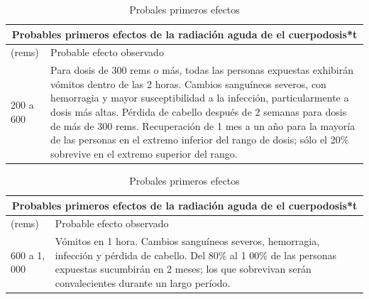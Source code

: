 \documentclass{beamer}
\begin{document}
\begin{frame}
	
	\begin{table}[h!]
		\centering
		\begin{tabular}{||m{1cm}|m{20em}||}
			\hline
			\multicolumn{2}{|c|}{Probables primeros efectos de la radiación aguda de el cuerpodosis*t} \\
			\hline	\hline
			(rems)                                                            & Probable efecto observado                                                                                                                                                          			\\ \hline
			200 a 600                                                                    & Para dosis de 300 rems o más, todas las personas expuestas exhibirán vómitos dentro de las 2 horas. Cambios sanguíneos severos, con hemorragia y mayor susceptibilidad a la infección, particularmente a dosis más altas. Pérdida de cabello después de 2 semanas para dosis de más de 300 rems. Recuperación de 1 mes a un año para la mayoría de las personas en el extremo inferior del rango de dosis; sólo el 20\% sobrevive en el extremo superior del rango. \\ \hline
		\end{tabular}
		\caption{Probales primeros efectos}
	\end{table}
	
\end{frame}


\begin{frame}
	
	\begin{table}[h!]
		\centering
		\begin{tabular}{||m{1cm}|m{20em}||}
			\hline
			\multicolumn{2}{|c|}{Probables primeros efectos de la radiación aguda de el cuerpodosis*t} \\
			\hline	\hline
			(rems)                                                            & Probable efecto observado                              	\\ \hline
			600 a 1, 000                                                                 & Vómitos en 1 hora. Cambios sanguíneos severos, hemorragia, infección y pérdida de cabello. Del 80\% al 1 00\% de las personas expuestas sucumbirán en 2 meses; los que sobrevivan serán convalecientes durante un largo período.                                                                                                                                                                                                                                    \\ \hline
		\end{tabular}
		\caption{Probales primeros efectos}
	\end{table}
	
\end{frame}
\end{document}
